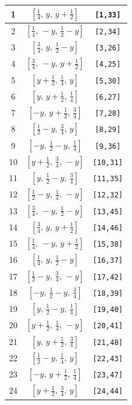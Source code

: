 \documentclass[fleqn,8pt]{jsarticle}
\begin{document}
\begin{longtable}{ccc}
1 & $\left[ \frac{1}{4},\, y,\, y + \frac{1}{2} \right]$ & {\tt [1,33]} \\ \hline
2 & $\left[ \frac{1}{4},\, - y,\, \frac{1}{2} - y \right]$ & {\tt [2,34]} \\ \hline
3 & $\left[ \frac{3}{4},\, y,\, \frac{1}{2} - y \right]$ & {\tt [3,26]} \\ \hline
4 & $\left[ \frac{3}{4},\, - y,\, y + \frac{1}{2} \right]$ & {\tt [4,25]} \\ \hline
5 & $\left[ y + \frac{1}{2},\, \frac{1}{4},\, y \right]$ & {\tt [5,30]} \\ \hline
6 & $\left[ y,\, y + \frac{1}{2},\, \frac{1}{4} \right]$ & {\tt [6,27]} \\ \hline
7 & $\left[ - y,\, y + \frac{1}{2},\, \frac{3}{4} \right]$ & {\tt [7,28]} \\ \hline
8 & $\left[ \frac{1}{2} - y,\, \frac{3}{4},\, y \right]$ & {\tt [8,29]} \\ \hline
9 & $\left[ - y,\, \frac{1}{2} - y,\, \frac{1}{4} \right]$ & {\tt [9,36]} \\ \hline
10 & $\left[ y + \frac{1}{2},\, \frac{3}{4},\, - y \right]$ & {\tt [10,31]} \\ \hline
11 & $\left[ y,\, \frac{1}{2} - y,\, \frac{3}{4} \right]$ & {\tt [11,35]} \\ \hline
12 & $\left[ \frac{1}{2} - y,\, \frac{1}{4},\, - y \right]$ & {\tt [12,32]} \\ \hline
13 & $\left[ \frac{3}{4},\, - y,\, \frac{1}{2} - y \right]$ & {\tt [13,45]} \\ \hline
14 & $\left[ \frac{3}{4},\, y,\, y + \frac{1}{2} \right]$ & {\tt [14,46]} \\ \hline
15 & $\left[ \frac{1}{4},\, - y,\, y + \frac{1}{2} \right]$ & {\tt [15,38]} \\ \hline
16 & $\left[ \frac{1}{4},\, y,\, \frac{1}{2} - y \right]$ & {\tt [16,37]} \\ \hline
17 & $\left[ \frac{1}{2} - y,\, \frac{3}{4},\, - y \right]$ & {\tt [17,42]} \\ \hline
18 & $\left[ - y,\, \frac{1}{2} - y,\, \frac{3}{4} \right]$ & {\tt [18,39]} \\ \hline
19 & $\left[ y,\, \frac{1}{2} - y,\, \frac{1}{4} \right]$ & {\tt [19,40]} \\ \hline
20 & $\left[ y + \frac{1}{2},\, \frac{1}{4},\, - y \right]$ & {\tt [20,41]} \\ \hline
21 & $\left[ y,\, y + \frac{1}{2},\, \frac{3}{4} \right]$ & {\tt [21,48]} \\ \hline
22 & $\left[ \frac{1}{2} - y,\, \frac{1}{4},\, y \right]$ & {\tt [22,43]} \\ \hline
23 & $\left[ - y,\, y + \frac{1}{2},\, \frac{1}{4} \right]$ & {\tt [23,47]} \\ \hline
24 & $\left[ y + \frac{1}{2},\, \frac{3}{4},\, y \right]$ & {\tt [24,44]} \\
\end{longtable}
\end{document}
